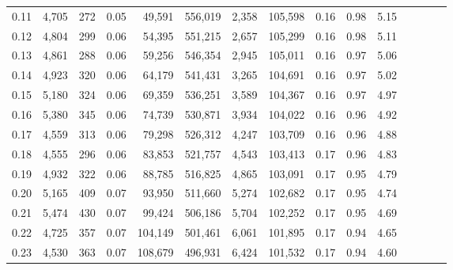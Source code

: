 \begin{tabular}{rrrcrrrrrrrrrrr}
0.11 &   4,705 &    272 &                                       0.05 &   49,591 &  556,019 &    2,358 &  105,598 &  0.16 &  0.98 &                         5.15 \\
0.12 &   4,804 &    299 &                                       0.06 &   54,395 &  551,215 &    2,657 &  105,299 &  0.16 &  0.98 &                         5.11 \\
0.13 &   4,861 &    288 &                                       0.06 &   59,256 &  546,354 &    2,945 &  105,011 &  0.16 &  0.97 &                         5.06 \\
0.14 &   4,923 &    320 &                                       0.06 &   64,179 &  541,431 &    3,265 &  104,691 &  0.16 &  0.97 &                         5.02 \\
0.15 &   5,180 &    324 &                                       0.06 &   69,359 &  536,251 &    3,589 &  104,367 &  0.16 &  0.97 &                         4.97 \\
0.16 &   5,380 &    345 &                                       0.06 &   74,739 &  530,871 &    3,934 &  104,022 &  0.16 &  0.96 &                         4.92 \\
0.17 &   4,559 &    313 &                                       0.06 &   79,298 &  526,312 &    4,247 &  103,709 &  0.16 &  0.96 &                         4.88 \\
0.18 &   4,555 &    296 &                                       0.06 &   83,853 &  521,757 &    4,543 &  103,413 &  0.17 &  0.96 &                         4.83 \\
0.19 &   4,932 &    322 &                                       0.06 &   88,785 &  516,825 &    4,865 &  103,091 &  0.17 &  0.95 &                         4.79 \\
0.20 &   5,165 &    409 &                                       0.07 &   93,950 &  511,660 &    5,274 &  102,682 &  0.17 &  0.95 &                         4.74 \\
0.21 &   5,474 &    430 &                                       0.07 &   99,424 &  506,186 &    5,704 &  102,252 &  0.17 &  0.95 &                         4.69 \\
0.22 &   4,725 &    357 &                                       0.07 &  104,149 &  501,461 &    6,061 &  101,895 &  0.17 &  0.94 &                         4.65 \\
0.23 &   4,530 &    363 &                                       0.07 &  108,679 &  496,931 &    6,424 &  101,532 &  0.17 &  0.94 &                         4.60 \\

\end{tabular}
